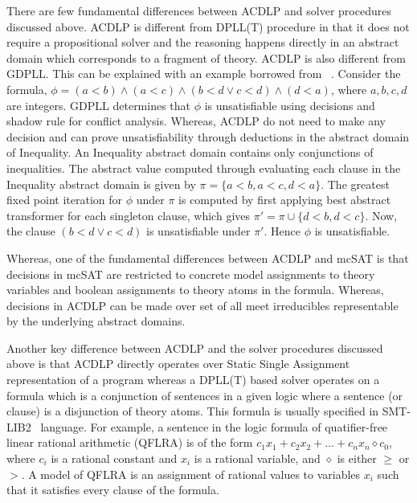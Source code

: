 %
There are few fundamental differences between ACDLP and solver procedures discussed above. 
ACDLP is different from DPLL(T) procedure in that it does not require a propositional solver and 
the reasoning happens directly in an abstract domain which corresponds to a fragment of theory.  
ACDLP is also different from GDPLL.  This can be explained with an example borrowed from
~\cite{DBLP:conf/cav/McMillanKS09}.  Consider the formula, 
$\phi = (a < b) \wedge (a < c) \wedge (b < d \vee c < d) \wedge (d < a)$, where $a,b,c,d$ are integers.  
GDPLL determines that $\phi$ is unsatisfiable using decisions and shadow rule for conflict analysis.  
Whereas, ACDLP do not need to make any decision and can prove unsatisfiability through deductions 
in the abstract domain of Inequality.  An Inequality abstract domain contains only conjunctions of 
inequalities. The abstract value computed through evaluating each clause in the Inequality abstract 
domain is given by $\pi = \{a < b, a < c, d < a\}$.  The greatest fixed point iteration for $\phi$ under
$\pi$ is computed by first applying best abstract transformer for each singleton clause, which gives 
$\pi'= \pi \cup \{ d < b, d < c \}$.  Now, the clause $(b < d \vee c < d)$ is unsatisfiable under 
$\pi'$.  Hence $\phi$ is unsatisfiable. 


Whereas, one of the fundamental differences between ACDLP and mcSAT is that decisions in mcSAT 
are restricted to concrete model assignments to theory variables and boolean assignments to 
theory atoms in the formula.  Whereas, decisions in ACDLP can be made over set of all meet 
irreducibles representable by the underlying abstract domains.



Another key difference between ACDLP and the solver procedures discussed above is that 
ACDLP directly operates over Static Single Assignment representation of a program 
whereas a DPLL(T) based solver operates on a formula which is a conjunction of 
sentences in a given logic where a sentence (or clause) is a disjunction of 
theory atoms. This formula is usually specified in SMT-LIB2~\cite{smt-lib2} 
language.  For example, a sentence in the logic formula of 
quatifier-free linear rational arithmetic (QFLRA) is of the form 
$c_1x_1 + c_2x_2 + \ldots + c_nx_n \diamond c_0$, where $c_i$ is a rational constant 
and $x_i$ is a rational variable, and $\diamond$ is either $\geq$ or $>$.  A model of 
QFLRA is an assignment of rational values to variables $x_i$ such that it satisfies 
every clause of the formula.   

